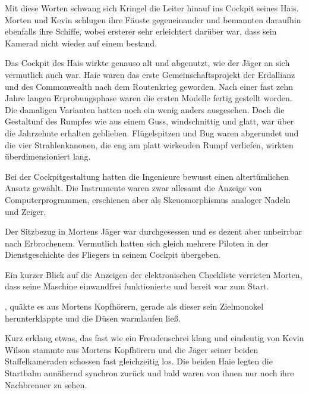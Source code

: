 Mit diese Worten schwang sich Kringel die Leiter hinauf ins Cockpit seines Hais. Morten und Kevin schlugen ihre Fäuste gegeneinander und bemannten daraufhin ebenfalls ihre Schiffe, wobei ersterer sehr erleichtert darüber war, dass sein Kamerad nicht wieder auf einem  bestand.

\par

Das Cockpit des Hais wirkte genauso alt und abgenutzt, wie der Jäger an sich vermutlich auch war. Haie waren das erste Gemeinschaftsprojekt der Erdallianz und des Commonwealth nach dem Routenkrieg geworden. Nach einer fast zehn Jahre langen Erprobungsphase waren die ersten Modelle fertig gestellt worden. Die damaligen Varianten hatten noch ein wenig anders ausgesehen. Doch die Gestaltunf des Rumpfes wie aus einem Guss, windschnittig und glatt, war über die Jahrzehnte erhalten geblieben. Flügelspitzen und Bug waren abgerundet und die vier Strahlenkanonen, die eng am platt wirkenden Rumpf verliefen, wirkten überdimensioniert lang.

\par

Bei der Cockpitgestaltung hatten die Ingenieure bewusst einen altertümlichen Ansatz gewählt. Die Instrumente waren zwar allesamt die Anzeige von Computerprogrammen, erschienen aber als Skeuomorphismus analoger Nadeln und Zeiger.

\par

Der Sitzbezug in Mortens Jäger war durchgesessen und es dezent aber unbeirrbar nach Erbrochenem. Vermutlich hatten sich gleich mehrere Piloten in der Dienstgeschichte des Fliegers in seinem Cockpit übergeben.

\par

Ein kurzer Blick auf die Anzeigen der elektronischen Checkliste verrieten Morten, dass seine Maschine einwandfrei funktionierte und bereit war zum Start.

\par

, quäkte es aus Mortens Kopfhörern, gerade als dieser sein Zielmonokel herunterklappte und die Düsen warmlaufen ließ. 

\par

Kurz erklang etwas, das fast wie ein Freudenschrei klang und eindeutig von Kevin Wilson stammte aus Mortens Kopfhörern und die Jäger seiner beiden Staffelkameraden schossen fast gleichzeitig los. Die beiden Haie legten die Startbahn annähernd synchron zurück und bald waren von ihnen nur noch ihre Nachbrenner zu sehen.


